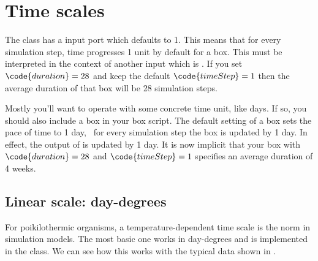 
%
\section{Time scales}
The  class has a  input port which defaults to 1. This means that for every simulation step, time progresses 1 unit by default for a  box. This must be interpreted in the context of another  input which is . If you set $\code{duration}=28$ and keep the default $\code{timeStep}=1$ then the average duration of that box will be 28 simulation steps. 

Mostly you'll want to operate with some concrete time unit, like days. If so, you should also include a  box in your box script. The default setting of a  box sets the pace of time to 1 day, \ie\ for every simulation step the  box is updated by 1 day. In effect, the  output of  is updated by 1 day. It is now implicit that your  box with $\code{duration}=28$ and $\code{timeStep}=1$ specifies an average duration of 4 weeks.

\subsection{Linear scale: day-degrees}
For poikilothermic organisms, a temperature-dependent time scale is the norm in simulation models. The most basic one works in day-degrees and is implemented in the  class. We can see how this works with the typical data shown in .

